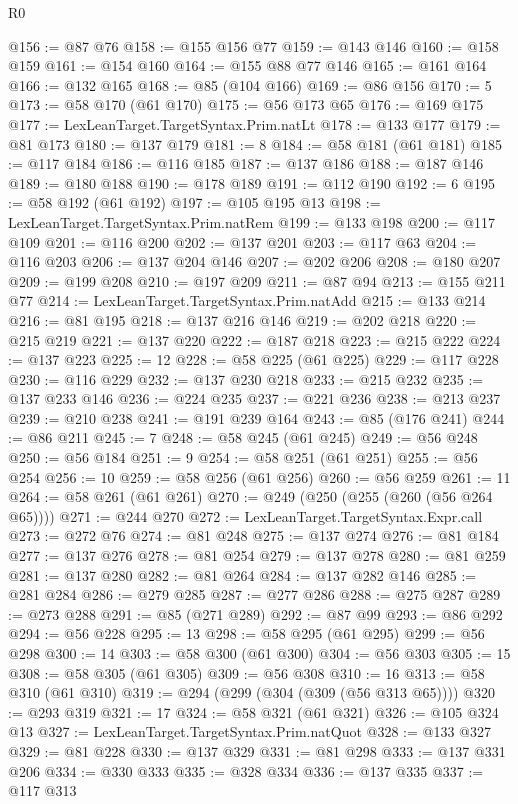 \begin{lexlean}{R0}
\begin{coremodule}
@156 := @87 @76
@158 := @155 @156 @77
@159 := @143 @146
@160 := @158 @159
@161 := @154 @160
@164 := @155 @88 @77 @146
@165 := @161 @164
@166 := @132 @165
@168 := @85 (@104 @166)
@169 := @86 @156
@170 := 5
@173 := @58 @170 (@61 @170)
@175 := @56 @173 @65
@176 := @169 @175
@177 := LexLeanTarget.TargetSyntax.Prim.natLt
@178 := @133 @177
@179 := @81 @173
@180 := @137 @179
@181 := 8
@184 := @58 @181 (@61 @181)
@185 := @117 @184
@186 := @116 @185
@187 := @137 @186
@188 := @187 @146
@189 := @180 @188
@190 := @178 @189
@191 := @112 @190
@192 := 6
@195 := @58 @192 (@61 @192)
@197 := @105 @195 @13
@198 := LexLeanTarget.TargetSyntax.Prim.natRem
@199 := @133 @198
@200 := @117 @109
@201 := @116 @200
@202 := @137 @201
@203 := @117 @63
@204 := @116 @203
@206 := @137 @204 @146
@207 := @202 @206
@208 := @180 @207
@209 := @199 @208
@210 := @197 @209
@211 := @87 @94
@213 := @155 @211 @77
@214 := LexLeanTarget.TargetSyntax.Prim.natAdd
@215 := @133 @214
@216 := @81 @195
@218 := @137 @216 @146
@219 := @202 @218
@220 := @215 @219
@221 := @137 @220
@222 := @187 @218
@223 := @215 @222
@224 := @137 @223
@225 := 12
@228 := @58 @225 (@61 @225)
@229 := @117 @228
@230 := @116 @229
@232 := @137 @230 @218
@233 := @215 @232
@235 := @137 @233 @146
@236 := @224 @235
@237 := @221 @236
@238 := @213 @237
@239 := @210 @238
@241 := @191 @239 @164
@243 := @85 (@176 @241)
@244 := @86 @211
@245 := 7
@248 := @58 @245 (@61 @245)
@249 := @56 @248
@250 := @56 @184
@251 := 9
@254 := @58 @251 (@61 @251)
@255 := @56 @254
@256 := 10
@259 := @58 @256 (@61 @256)
@260 := @56 @259
@261 := 11
@264 := @58 @261 (@61 @261)
@270 := @249 (@250 (@255 (@260 (@56 @264 @65))))
@271 := @244 @270
@272 := LexLeanTarget.TargetSyntax.Expr.call
@273 := @272 @76
@274 := @81 @248
@275 := @137 @274
@276 := @81 @184
@277 := @137 @276
@278 := @81 @254
@279 := @137 @278
@280 := @81 @259
@281 := @137 @280
@282 := @81 @264
@284 := @137 @282 @146
@285 := @281 @284
@286 := @279 @285
@287 := @277 @286
@288 := @275 @287
@289 := @273 @288
@291 := @85 (@271 @289)
@292 := @87 @99
@293 := @86 @292
@294 := @56 @228
@295 := 13
@298 := @58 @295 (@61 @295)
@299 := @56 @298
@300 := 14
@303 := @58 @300 (@61 @300)
@304 := @56 @303
@305 := 15
@308 := @58 @305 (@61 @305)
@309 := @56 @308
@310 := 16
@313 := @58 @310 (@61 @310)
@319 := @294 (@299 (@304 (@309 (@56 @313 @65))))
@320 := @293 @319
@321 := 17
@324 := @58 @321 (@61 @321)
@326 := @105 @324 @13
@327 := LexLeanTarget.TargetSyntax.Prim.natQuot
@328 := @133 @327
@329 := @81 @228
@330 := @137 @329
@331 := @81 @298
@333 := @137 @331 @206
@334 := @330 @333
@335 := @328 @334
@336 := @137 @335
@337 := @117 @313

\end{coremodule}
\end{lexlean}
